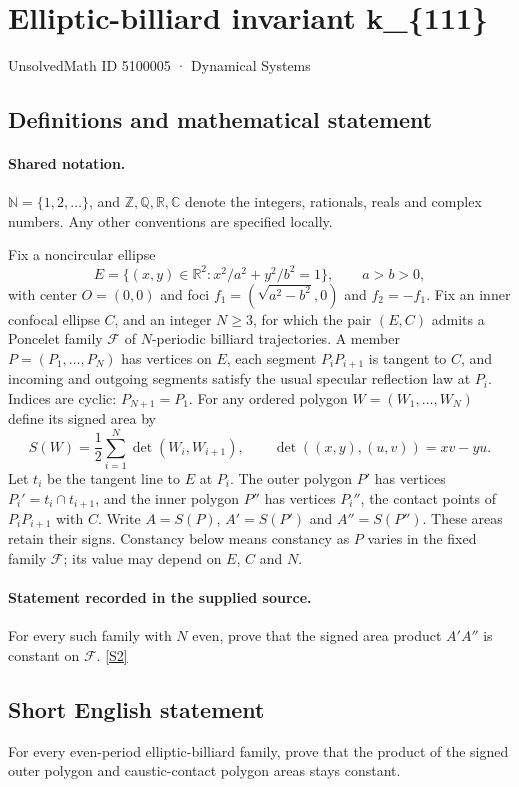 \documentclass[11pt]{article}
\newcommand{\sref}[2]{\hyperlink{source:#1:#2}{[S#2]}}
\begin{document}
\setcounter{section}{5100004}
\section{Elliptic-billiard invariant k\_\{111\}}\label{5100005}
{\small\sffamily UnsolvedMath ID 5100005 · Dynamical Systems}
\subsection{Definitions and mathematical statement}

\paragraph{Shared notation.}$\mathbb N=\{1,2,\ldots\}$, and $\mathbb Z,\mathbb Q,\mathbb R,\mathbb C$ denote the integers, rationals, reals and complex numbers. Any other conventions are specified locally.


Fix a noncircular ellipse
\[
E=\{(x,y)\in\mathbb R^2:x^2/a^2+y^2/b^2=1\},\qquad a>b>0,
\]
with center $O=(0,0)$ and foci $f_1=(\sqrt{a^2-b^2},0)$ and $f_2=-f_1$. Fix an inner confocal ellipse $C$, and an integer $N\geq3$, for which the pair $(E,C)$ admits a Poncelet family $\mathcal F$ of $N$-periodic billiard trajectories. A member $P=(P_1,\ldots,P_N)$ has vertices on $E$, each segment $P_iP_{i+1}$ is tangent to $C$, and incoming and outgoing segments satisfy the usual specular reflection law at $P_i$. Indices are cyclic: $P_{N+1}=P_1$.
For any ordered polygon $W=(W_1,\ldots,W_N)$ define its signed area by
\[
S(W)=\frac12\sum_{i=1}^N\det(W_i,W_{i+1}),\qquad
\det((x,y),(u,v))=xv-yu.
\]
Let $t_i$ be the tangent line to $E$ at $P_i$. The outer polygon $P'$ has vertices $P_i'=t_i\cap t_{i+1}$, and the inner polygon $P''$ has vertices $P_i''$, the contact points of $P_iP_{i+1}$ with $C$. Write $A=S(P)$, $A'=S(P')$ and $A''=S(P'')$. These areas retain their signs. Constancy below means constancy as $P$ varies in the fixed family $\mathcal F$; its value may depend on $E$, $C$ and $N$.

\paragraph{Statement recorded in the supplied source.}
For every such family with $N$ even, prove that the signed area product $A' A''$ is constant on $\mathcal F$. \sref{5100005}{2}
\subsection{Short English statement}
For every even-period elliptic-billiard family, prove that the product of the signed outer polygon and caustic-contact polygon areas stays constant.
\end{document}
